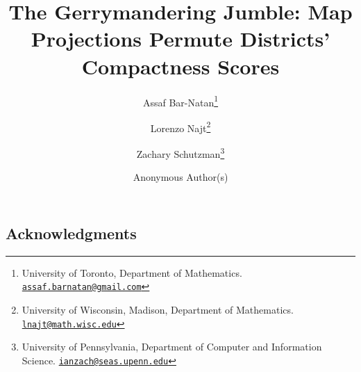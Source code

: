 \documentclass{article}
\title{The Gerrymandering Jumble: Map Projections Permute Districts' Compactness Scores}
\author{Assaf Bar-Natan\thanks{University of Toronto, Department of Mathematics. \href{mailto:assaf.barnatan@gmail.com}{\texttt{assaf.barnatan@gmail.com}}} 
	\and Lorenzo Najt\thanks{University of Wisconsin, Madison, Department of Mathematics. \href{mailto:lnajt4@gmail.com}{\texttt{lnajt@math.wisc.edu}}}  
	\and Zachary Schutzman\thanks{University of Pennsylvania, Department of Computer and Information Science. \href{mailto:ianzach@seas.upenn.edu}{\texttt{ianzach@seas.upenn.edu}}}  }
\author{Anonymous Author(s)}
\theoremstyle{definition}
\theoremstyle{remark}
\newcommand{\mute}[1]{}
\begin{document}
\maketitle
\begin{abstract}
\noindent
\end{abstract}
\ifarxiv
\else
\fi









%




%



\ifarxiv
\subsection*{Acknowledgments}


\else
\mute{
\begin{acknowledgment}{Acknowledgments}

\end{acknowledgment}
}
\fi





%
\end{document}
